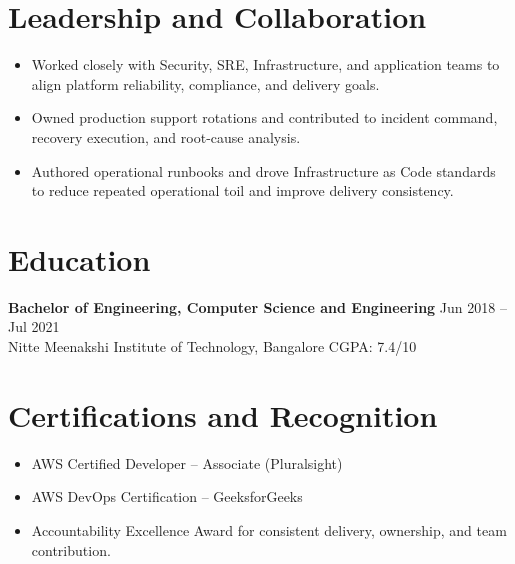 \documentclass[a4paper,10pt]{article}
\begin{document}
\section*{Leadership and Collaboration}
\begin{itemize}
    \item Worked closely with Security, SRE, Infrastructure, and application teams to align platform reliability, compliance, and delivery goals.
    \item Owned production support rotations and contributed to incident command, recovery execution, and root-cause analysis.
    \item Authored operational runbooks and drove Infrastructure as Code standards to reduce repeated operational toil and improve delivery consistency.
\end{itemize}

\section*{Education}
\textbf{Bachelor of Engineering, Computer Science and Engineering} \hfill Jun 2018 -- Jul 2021\\
Nitte Meenakshi Institute of Technology, Bangalore \textbar{} CGPA: 7.4/10

\section*{Certifications and Recognition}
\begin{itemize}
    \item AWS Certified Developer -- Associate (Pluralsight)
    \item AWS DevOps Certification -- GeeksforGeeks
    \item Accountability Excellence Award for consistent delivery, ownership, and team contribution.
\end{itemize}
\end{document}

